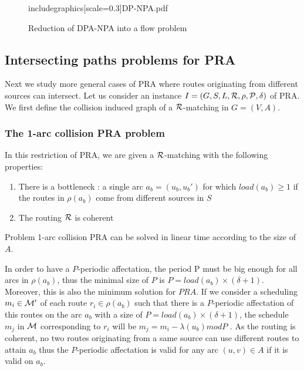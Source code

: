 \documentclass{article}
\newcommand\rmatching{$\cal R$-matching\xspace}
\begin{document}
{\begin{figure}[!t]
\centering
includegraphics[scale=0.3]{DP-NPA.pdf}
\caption{Reduction of DPA-NPA into a flow problem}
\label{Modelling of DP-NPA Problem}
\end{figure}


\subsection{Intersecting paths problems for PRA}

Next we study more general cases of PRA where routes originating from different sources can intersect. Let us consider an instance $I= (G, S, L, \cal R, \rho, P, \delta)$ of PRA. We first define the collision induced graph of a \rmatching in $G=(V,A)$.


\subsubsection{The 1-arc collision PRA problem}

In this restriction of PRA, we are given a \rmatching with the following properties:
\begin{enumerate}
\item There is a bottleneck : a single arc $a_b=(u_b, u_b')$ for which $load(a_b) \geq 1$ if the routes in $\rho(a_b)$ come from different sources in $S$
\item The routing $\cal R$ is coherent 
\end{enumerate}

\begin{proposition}
\label{1-arc PRA}
Problem 1-arc collision PRA can be solved in linear time according to the size of $A$.

\end{proposition}

In order to have a $P$-periodic affectation, the period P must be big enough for all arcs in $\rho(a_b)$, thus the minimal size of $P$ is $P= load(a_b) \times (\delta + 1)$. Moreover, this is also the minimum solution for $PRA$. If we consider a scheduling $m_i \in \cal M'$ of each route $r_i \in \rho(a_b)$ such that there is a $P$-periodic affectation of this routes on the arc $a_b$ with a size of $P =  load(a_b) \times (\delta + 1)$, the schedule $m_j$ in $\cal M$ corresponding to $r_i$ will be $m_j = m_i - \lambda(u_b) mod P$ . As the routing is coherent, no two routes originating from a same source can use different routes to attain $a_b$ thus the $P$-periodic affectation is valid for any arc $(u,v) \in A$ if it is valid on $a_b$.


}
\end{document}
